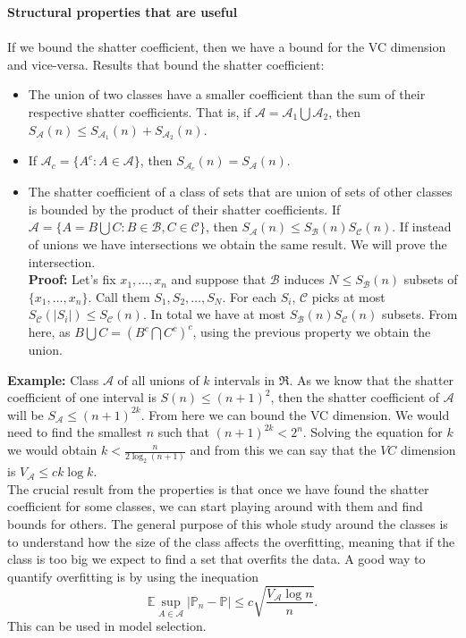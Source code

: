 \documentclass[11pt, english]{article}
\begin{document}
\textbf{Structural properties that are useful}\\\\ 
If we bound the shatter coefficient, then we have a bound for the VC dimension and vice-versa. Results that bound the shatter coefficient:
\begin{itemize}
	\item The union of two classes have a smaller coefficient than the sum of their respective shatter coefficients. That is, if $\mathcal{A}=\mathcal{A}_1\bigcup\mathcal{A}_2$, then 
	$S_{\mathcal{A}} (n)\leq S_{\mathcal{A}_1}(n) +S_{\mathcal{A}_2}(n)$.
 	\item If $\mathcal{A}_c=\{A^c:A\in\mathcal{A}\}$, then $S_{\mathcal{A}_c}(n)=S_{\mathcal{A}}(n)$.
	\item The shatter coefficient of a class of sets that are union of sets of other classes is bounded by the product of their shatter coefficients. If $\mathcal{A}=\{A=B\bigcup C:B\in\mathcal{B},C\in\mathcal{C}\}$, then $S_{\mathcal{A}}(n)\leq S_{\mathcal{B}}(n)S_{\mathcal{C}}(n)$. If instead of unions we have intersections we obtain the same result. We will prove the intersection.\\
	\textbf{Proof:} Let's fix $x_1,\dots,x_n$ and suppose that $\mathcal{B}$ induces $N\leq S_{\mathcal{B}}(n)$ subsets of $\{x_1,\dots,x_n\}$. Call them $S_1,S_2,\dots,S_N$. For each $S_i$, $\mathcal{C}$ picks at most $S_{\mathcal{C}}(|S_i|)\leq S_{\mathcal{C}}(n)$. In total we have at most $S_{\mathcal{B}}(n)S_{\mathcal{C}}(n)$ subsets. From here, as $B\bigcup C=(B^c\bigcap C^c)^c$, using the previous property we obtain the union.
\end{itemize}
\textbf{Example:} Class $\mathcal{A}$ of all unions of $k$ intervals in $\Re$. As we know that the shatter coefficient of one interval is $S(n)\leq (n+1)^2$, then the shatter coefficient of $\mathcal{A}$ will be $S_{\mathcal{A}}\leq (n+1)^{2k}$. From here we can bound the VC dimension. We would need to find the smallest $n$ such that $(n+1)^{2k}<2^n$. Solving the equation for $k$ we would obtain $k<\frac{n}{2\log_2(n+1)}$ and from this we can say that the $VC$ dimension is $V_{\mathcal{A}}\leq ck\log k$.\\

The crucial result from the properties is that once we have found the shatter coefficient for some classes, we can start playing around with them and find bounds for others. The general purpose of this whole study around the classes is to understand how the size of the class  affects the overfitting, meaning that if the class is too big we expect to find a set that overfits the data. A good way to quantify overfitting is by using the inequation 
\begin{equation}
	\mathbb{E}\underset{A\in\mathcal{A}}{\sup}|\mathbb{P}_n-\mathbb{P}|\leq c\sqrt{\frac{V_{\mathcal{A}}\log n}{n}}.
\end{equation}
This can be used in model selection.
\end{document}
